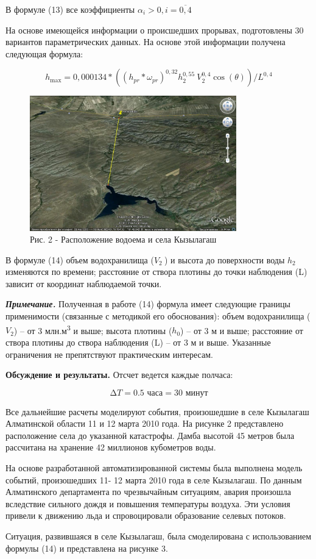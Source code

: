 В формуле (13) все коэффициенты
\(\alpha_{i}>0,i=\overline{0,4}\)

На основе имеющейся информации о происшедших прорывах, подготовлены 30
вариантов параметрических данных. На основе этой информации получена
следующая формула:

\begin{equation}
h_{\max} = 0,000134*(\left( h_{pr}*\omega_{pr} \right)^{0,32}h_{2}^{0,55}\ V_{2}^{0,4}\cos(\theta))/L^{0,4}
\end{equation}

\begin{figure}[H]
	\centering
	\includegraphics[width=0.8\textwidth]{media/ict/image3}
	\caption*{Рис. 2 - Расположение водоема и села Кызылагаш}
\end{figure}

\begin{multicols}{2}
В формуле (14) объем водохранилища (\(V_{2}\ \)) и высота до поверхности
воды \(h_{2}\) изменяются по времени; расстояние от створа плотины до
точки наблюдения (L) зависит от координат наблюдаемой точки.

\emph{{\bfseries Примечание.}} Полученная в работе (14) формула имеет
следующие границы применимости (связанные с методикой его обоснования):
объем водохранилища (\(V_{2}\)) -- от 3 млн.м\textsuperscript{3} и выше;
высота плотины (\(h_{0}\)) -- от 3 м и выше; расстояние от створа
плотины до створа наблюдения (L) -- от 3 м и выше. Указанные ограничения
не препятствуют практическим интересам.

{\bfseries Обсуждение и результаты.} Отсчет ведется каждые полчаса:

\[\mathrm{\Delta}T = 0.5 \text{ часа} = 30 \text{ минут}\]

Все дальнейшие расчеты моделируют события, произошедшие в селе Кызылагаш
Алматинской области 11 и 12 марта 2010 года. На рисунке 2 представлено
расположение села до указанной катастрофы. Дамба высотой 45 метров была
рассчитана на хранение 42 миллионов кубометров воды.

На основе разработанной автоматизированной системы была выполнена модель
событий, произошедших 11- 12 марта 2010 года в селе Кызылагаш. По данным
Алматинского департамента по чрезвычайным ситуациям, авария произошла
вследствие сильного дождя и повышения температуры воздуха. Эти условия
привели к движению льда и спровоцировали образование селевых потоков.

Ситуация, развившаяся в селе Кызылагаш, была смоделирована с
использованием формулы (14) и представлена на рисунке 3.
\end{multicols}

